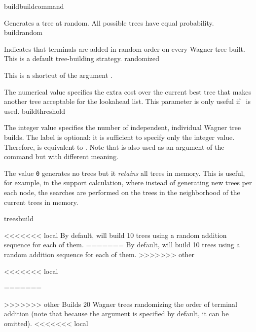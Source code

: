 \begin{command}{build}{buildcommand}
\begin{arguments}
            {Generates a tree at random. All possible trees have equal probability.}
            {buildrandom}

            {Indicates that terminals are added in random order on every Wagner tree built. 
            This is a default tree-building strategy.}
            {randomized}

            {This is a shortcut of the argument .}
            {}

            {The numerical value specifies the extra cost over the current best
            tree that makes another tree acceptable for the lookahead list. This 
            parameter is only useful if~ is used.}
            {buildthreshold}
            
            {The integer value specifies the number of independent, individual
            Wagner tree builds. The label  is optional: it is
            sufficient to specify only the integer value. Therefore,  is
            equivalent to .  Note that   is
            also used as an argument of the command 
            but with different meaning.
            
            The value \texttt{0} generates no trees but it \emph{retains} all trees in memory.
            This is useful, for example, in the  support calculation,
            where instead of generating new trees per each node, the searches are
            performed on the trees in the neighborhood of the current trees in memory.}
            {treesbuild}
            
    \end{arguments}
      
<<<<<<< local
       {By default, \poy will build 10 trees using a random addition sequence for
       each of them.}
=======
        { By default, \poy will build 10 trees using a random addition sequence
          for each of them.}
>>>>>>> other

<<<<<<< local
	\begin{poyexamples}
=======
    \begin{poyexamples}
>>>>>>> other
            {Builds 20 Wagner trees randomizing the order of terminal
            addition (note that because the argument  
            is specified by default, it can be omitted).}
<<<<<<< local
           

\end{poyexamples}
\end{poyexamples}
\end{command}

